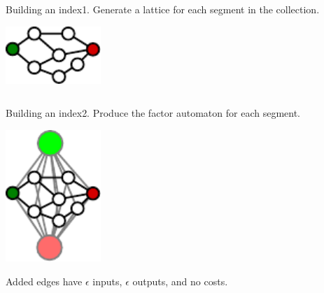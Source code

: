 \begin{frame}{Building an index}{1. Generate a lattice for each segment in the collection.}
  \begin{center}
    \includegraphics[width=36mm]{figures/lattice}
  \end{center}
  \begin{overlayarea}{\textwidth}{24mm}
    \begin{columns}[t]
      \column{54mm}
      \column{54mm}
    \end{columns}
  \end{overlayarea}
\end{frame}

\begin{frame}{Building an index}{2. Produce the factor automaton for each segment.}
  \begin{center}
    \includegraphics[width=36mm]{figures/factor}
    \end{center}
  \vfill
  Added edges have $\epsilon$ inputs, $\epsilon$ outputs, and no costs.
\end{frame}

